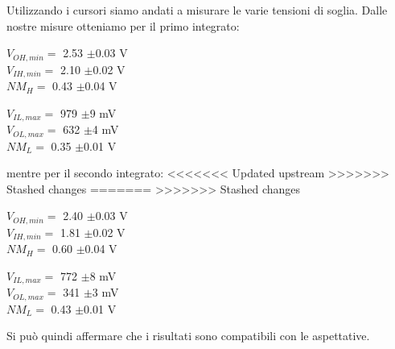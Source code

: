 \documentclass[10pt, a4paper, italian]{article}
\begin{document}
Utilizzando i cursori siamo andati a misurare le varie tensioni di soglia.
Dalle nostre misure otteniamo per il primo integrato:
\begin{multicols}{2}
    \centering
    $V_{OH,min}=$ 2.53 $\pm$0.03 V\\
    $V_{IH,min}=$ 2.10 $\pm$0.02 V\\
    $NM_H=$ 0.43 $\pm$0.04 V
    
    $V_{IL,max}=$ 979 $\pm$9 mV\\
    $V_{OL,max}=$ 632 $\pm$4 mV\\
    $NM_L=$ 0.35 $\pm$0.01 V
\end{multicols}
mentre per il secondo integrato:
<<<<<<< Updated upstream
>>>>>>> Stashed changes
=======
>>>>>>> Stashed changes
\begin{multicols}{2}
    \centering
    $V_{OH,min}=$ 2.40 $\pm$0.03 V\\
    $V_{IH,min}=$ 1.81 $\pm$0.02 V\\
    $NM_H=$ 0.60 $\pm$0.04 V
    
    $V_{IL,max}=$ 772 $\pm$8 mV\\
    $V_{OL,max}=$ 341 $\pm$3 mV\\
    $NM_L=$ 0.43 $\pm$0.01 V
\end{multicols}
Si può quindi affermare che i risultati sono compatibili con le aspettative.
\end{document}
